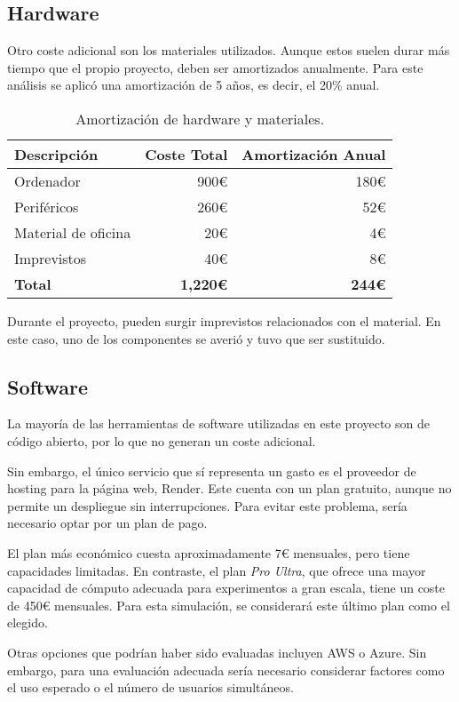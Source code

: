 \subsection{Hardware}

Otro coste adicional son los materiales utilizados. Aunque estos suelen durar más tiempo que el propio proyecto, deben ser amortizados anualmente. Para este análisis se aplicó una amortización de 5 años, es decir, el 20\% anual.

\begin{table}[H]
\centering
\begin{tabular}{lrr}
\toprule
Descripción & Coste Total & Amortización Anual \\ 
\midrule
Ordenador & 900€ & 180€ \\
Periféricos & 260€ & 52€ \\
Material de oficina & 20€ & 4€ \\
Imprevistos & 40€ & 8€ \\
\textbf{Total} & \textbf{1,220€} & \textbf{244€} \\ 
\bottomrule
\end{tabular}
\caption{Amortización de hardware y materiales.}
\end{table}

Durante el proyecto, pueden surgir imprevistos relacionados con el material. En este caso, uno de los componentes se averió y tuvo que ser sustituido.

\subsection{Software}

La mayoría de las herramientas de software utilizadas en este proyecto son de código abierto, por lo que no generan un coste adicional.

Sin embargo, el único servicio que sí representa un gasto es el proveedor de hosting para la página web, Render. Este cuenta con un plan gratuito, aunque no permite un despliegue sin interrupciones. Para evitar este problema, sería necesario optar por un plan de pago. 

El plan más económico cuesta aproximadamente 7€ mensuales, pero tiene capacidades limitadas. En contraste, el plan \textit{Pro Ultra}, que ofrece una mayor capacidad de cómputo adecuada para experimentos a gran escala, tiene un coste de 450€ mensuales. Para esta simulación, se considerará este último plan como el elegido.

Otras opciones que podrían haber sido evaluadas incluyen AWS o Azure. Sin embargo, para una evaluación adecuada sería necesario considerar factores como el uso esperado o el número de usuarios simultáneos.

